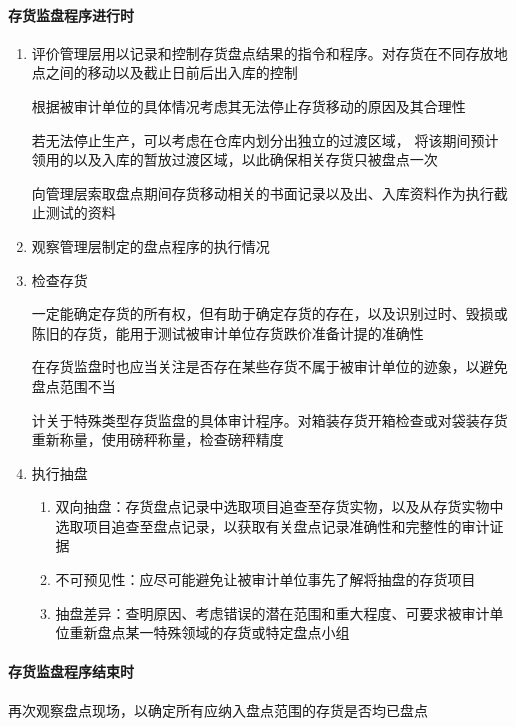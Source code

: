 \documentclass[UTF8,12pt]{ctexart}
\numberwithin{equation}{section} %
\numberwithin{figure}{section}
\numberwithin{table}{section}
\begin{document}
	\paragraph{存货监盘程序进行时}
	\begin{enumerate}
		\item 评价管理层用以记录和控制存货盘点结果的指令和程序。对存货在不同存放地点之间的移动以及截止日前后出入库的控制
		
		根据被审计单位的具体情况考虑其无法停止存货移动的原因及其合理性
		
		若无法停止生产，可以考虑在仓库内划分出独立的过渡区域， 将该期间预计领用的以及入库的暂放过渡区域，以此确保相关存货只被盘点一次
		  
		向管理层索取盘点期间存货移动相关的书面记录以及出、入库资料作为执行截止测试的资料
		
		\item 观察管理层制定的盘点程序的执行情况
		
		\item 检查存货
		
		一定能确定存货的所有权，但有助于确定存货的存在，以及识别过时、毁损或陈旧的存货，能用于测试被审计单位存货跌价准备计提的准确性
	 
		在存货监盘时也应当关注是否存在某些存货不属于被审计单位的迹象，以避免盘点范围不当
		
		 计关于特殊类型存货监盘的具体审计程序。对箱装存货开箱检查或对袋装存货重新称量，使用磅秤称量，检查磅秤精度
		
		\item 执行抽盘
		\begin{enumerate}
			\item 双向抽盘：存货盘点记录中选取项目追查至存货实物，以及从存货实物中选取项目追查至盘点记录，以获取有关盘点记录准确性和完整性的审计证据
			
			\item 不可预见性：应尽可能避免让被审计单位事先了解将抽盘的存货项目 
			
			\item 抽盘差异：查明原因、考虑错误的潜在范围和重大程度、可要求被审计单位重新盘点某一特殊领域的存货或特定盘点小组
		\end{enumerate}
	\end{enumerate}
	
	\paragraph{存货监盘程序结束时}
	再次观察盘点现场，以确定所有应纳入盘点范围的存货是否均已盘点
	
\end{document}
